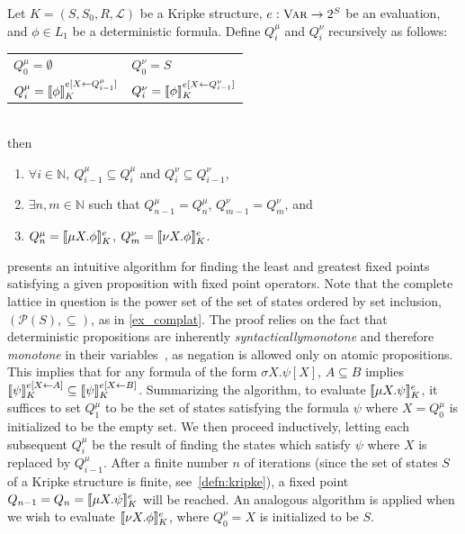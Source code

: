 \begin{cor}\label{cor:tarskialg}
    Let $K = (S,S_0,R,\mathcal{L})$ be a Kripke structure, $e: \textsc{Var} \to 2^S$ be an evaluation, and $\phi \in L_1$ be a deterministic \mucalc{} formula. Define $Q_i^\mu$ and $Q_i^\nu$ recursively as follows:
    \vspace{2mm}\\
    \begin{tabular}{l | l}
        $Q_0^\mu = \emptyset$   
            & $Q_0^\nu = S$\\
        $Q_i^\mu = {\llbracket}{} \phi {\rrbracket}{}_K^{e[X \leftarrow Q_{i-1}^\mu]}$ 
            & $Q_i^\nu = {\llbracket}{} \phi {\rrbracket}{}_K^{e[X \leftarrow Q_{i-1}^\nu]}$
    \end{tabular}\\

    \noindent then 
    \begin{enumerate}[label = (\roman*)]   
        \item $\forall i \in \mathbb{N},\ Q_{i-1}^\mu \subseteq Q_i^\mu$ and $Q_i^\nu \subseteq Q_{i-1}^\nu$,
        \item $\exists n,m \in \mathbb{N}$ such that $Q_{n-1}^\mu = Q_n^\mu$, $Q_{m-1}^\nu = Q_m^\nu$, and
        \item $Q_n^\mu = {\llbracket}{} \mu X.\phi {\rrbracket}{}_K^e$, $Q_m^\nu = {\llbracket}{} \nu X.\phi {\rrbracket}{}_K^e$.
    \end{enumerate}
\end{cor}

 presents an intuitive algorithm for finding the least and greatest fixed points satisfying a given \mucalc{} proposition with fixed point operators. Note that the complete lattice in question is the power set of the set of states ordered by set inclusion, ${(\mathcal{P}(S), \subseteq)}$, as in \autoref{ex_complat}. The proof relies on the fact that deterministic \mucalc{} propositions are inherently {\em syntactically\/monotone} and therefore {\em monotone\/} in their variables~\cite{Gurfinkel2004}, as negation is allowed only on atomic propositions. This implies that for any formula of the form $\sigma X.\psi[X]$, $A \subseteq B$ implies ${\llbracket}{} \psi {\rrbracket}{}_K^{e[X \leftarrow A]} \subseteq {\llbracket}{} \psi {\rrbracket}{}_K^{e[X \leftarrow B]}$. Summarizing the algorithm, to evaluate ${\llbracket}{} \mu X.\psi {\rrbracket}{}_K^e$, it suffices to set $Q_1^\mu$ to be the set of states satisfying the formula $\psi$ where $X = Q_0^\mu$ is initialized to be the empty set. We then proceed inductively, letting each subsequent $Q_i^\mu$ be the result of finding the states which satisfy $\psi$ where $X$ is replaced by $Q_{i-1}^\mu$. After a finite number $n$ of iterations (since the set of states $S$ of a Kripke structure is finite, see~\autoref{defn:kripke}), a fixed point $Q_{n-1} = Q_n = {\llbracket}{} \mu X.\psi {\rrbracket}{}_K^e$ will be reached. An analogous algorithm is applied when we wish to evaluate ${\llbracket}{} \nu X.\phi {\rrbracket}{}_K^e$, where $Q_0^\nu = X$ is initialized to be $S$.






